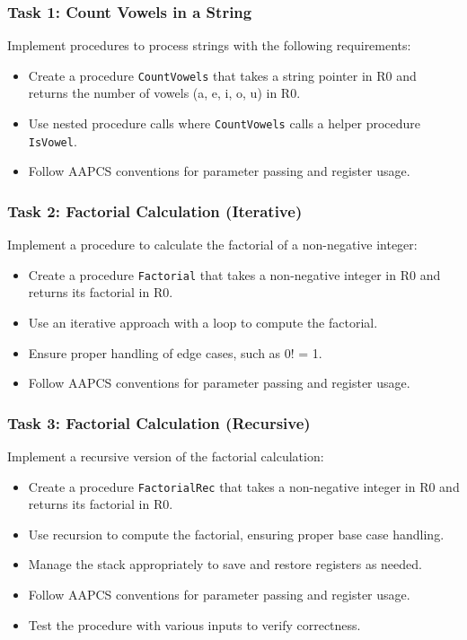 \subsubsection{Task 1: Count Vowels in a String}
Implement procedures to process strings with the following requirements:
\begin{itemize}[nosep]
    \item Create a procedure \texttt{CountVowels} that takes a string pointer in R0 and returns the number of vowels (a, e, i, o, u) in R0.
    \item Use nested procedure calls where \texttt{CountVowels} calls a helper procedure \texttt{IsVowel}.
    \item Follow AAPCS conventions for parameter passing and register usage.
\end{itemize}

\subsubsection{Task 2: Factorial Calculation (Iterative)}
Implement a procedure to calculate the factorial of a non-negative integer:
\begin{itemize}[nosep]
    \item Create a procedure \texttt{Factorial} that takes a non-negative integer in R0 and returns its factorial in R0.
    \item Use an iterative approach with a loop to compute the factorial.
    \item Ensure proper handling of edge cases, such as 0! = 1.
    \item Follow AAPCS conventions for parameter passing and register usage.
\end{itemize}
\subsubsection{Task 3: Factorial Calculation (Recursive)}
Implement a recursive version of the factorial calculation:
\begin{itemize}[nosep]
    \item Create a procedure \texttt{FactorialRec} that takes a non-negative integer in R0 and returns its factorial in R0.
    \item Use recursion to compute the factorial, ensuring proper base case handling.
    \item Manage the stack appropriately to save and restore registers as needed.
    \item Follow AAPCS conventions for parameter passing and register usage.
    \item Test the procedure with various inputs to verify correctness.
\end{itemize}